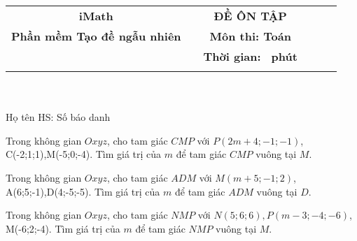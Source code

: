 \documentclass[12pt,a4paper]{article}
\newcommand{\tenso}{iMath}
\newcommand{\tentruong}{Phần mềm Tạo đề ngẫu nhiên}
\newcommand{\tenkythi}{ĐỀ ÔN TẬP}
\newcommand{\tenmonthi}{Môn thi: Toán}
\newcommand{\thoigian}{}
\newcommand{\tieude}[1]{
   \begin{tabular}{cm{3cm}cm{3cm}cm{3cm}}
    {\bf \tenso} & & {\bf \tenkythi} \\
    {\bf \tentruong} & & {\bf \tenmonthi}\\
    && {\bf Thời gian: \bf \thoigian \, phút}\\
    && { \fbox{\bf Mã đề: #1}}
   \end{tabular}\\\\
    
   {Họ tên HS: \dotfill Số báo danh \dotfill}\\
}
\newcommand{\chantrang}[2]{\rfoot{Trang \thepage $-$ Mã đề #2}}
\begin{document}


\tieude{001}
\chantrang{\pageref{LastPage}}{001}
\setcounter{page}{1}
\begin{ex}
	Trong không gian ${Oxyz}$, cho tam giác ${CMP}$ với $P(2 m + 4;-1;-1)$, C(-2;1;1),M(-5;0;-4). Tìm giá trị của ${m}$ để tam giác ${CMP}$ vuông tại ${M}$.
	
	\end{ex}

\begin{ex}
	Trong không gian ${Oxyz}$, cho tam giác ${ADM}$ với $M(m + 5;-1;2)$, A(6;5;-1),D(4;-5;-5). Tìm giá trị của ${m}$ để tam giác ${ADM}$ vuông tại ${D}$.
	
	\end{ex}

\begin{ex}
	Trong không gian ${Oxyz}$, cho tam giác ${NMP}$ với $N(5;6;6),P(m - 3;-4;-6)$, M(-6;2;-4). Tìm giá trị của ${m}$ để tam giác ${NMP}$ vuông tại ${M}$.
	
	\end{ex}
\end{document}
